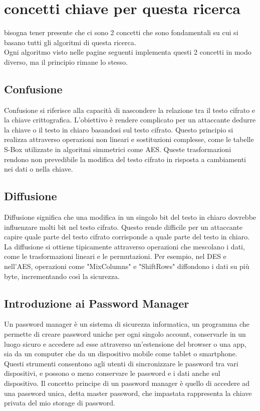 \documentclass[a4paper,12pt]{report}
\begin{document}
		\section{concetti chiave per questa ricerca}
			bisogna tener presente che ci sono 2 concetti che sono fondamentali 
			su cui si basano tutti gli algoritmi di questa ricerca.\\
			Ogni algoritmo visto nelle pagine seguenti implementa questi
			2 concetti in modo diverso, ma il principio rimane lo stesso.

			\subsection{Confusione}
			Confusione si riferisce alla capacità di nascondere la relazione tra
			il testo cifrato e la chiave crittografica. L'obiettivo è rendere
			complicato per un attaccante dedurre la chiave o il testo in chiaro
			basandosi sul testo cifrato. Questo principio si realizza attraverso
			operazioni non lineari e sostituzioni complesse, come le tabelle
			S-Box utilizzate in algoritmi simmetrici come AES. Queste
			trasformazioni rendono non prevedibile la modifica del testo cifrato
			in risposta a cambiamenti nei dati o nella chiave.

			\subsection{Diffusione}
			Diffusione significa che una modifica in un singolo bit del testo in
			chiaro dovrebbe influenzare molti bit nel testo cifrato. Questo
			rende difficile per un attaccante capire quale parte del testo
			cifrato corrisponde a quale parte del testo in chiaro. La diffusione
			si ottiene tipicamente attraverso operazioni che mescolano i dati,
			come le trasformazioni lineari e le permutazioni. Per esempio, nel
			DES e nell'AES, operazioni come "MixColumns" e "ShiftRows"
			diffondono i dati su più byte, incrementando così la sicurezza.

		\subsection*{Introduzione ai Password Manager} 
		Un password manager è un sistema di
		sicurezza informatica, un programma che permette di creare password uniche per
		ogni singolo account, conservarle in un luogo sicuro e accedere ad esse
		attraverso un’estensione del browser o una app, sia da un computer che da un
		dispositivo mobile come tablet o smartphone. Questi strumenti consentono agli
		utenti di sincronizzare le password tra vari dispositivi, e possono o meno
		conservare le password e i dati anche sul dispositivo.
		Il concetto principe di un password manager è quello di accedere
		ad una password unica, detta master password, che impastata
		rappresenta la chiave privata del mio storage di password.
\end{document}
